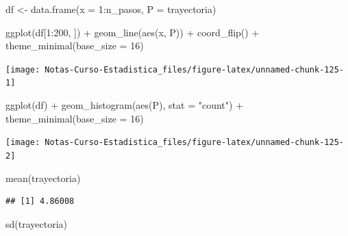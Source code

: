 \documentclass[
  12pt,
]{book}
\newenvironment{Shaded}{\begin{snugshade}}{\end{snugshade}}
\newcommand{\AttributeTok}[1]{\textcolor[rgb]{0.77,0.63,0.00}{#1}}
\newcommand{\DecValTok}[1]{\textcolor[rgb]{0.00,0.00,0.81}{#1}}
\newcommand{\FunctionTok}[1]{\textcolor[rgb]{0.00,0.00,0.00}{#1}}
\newcommand{\NormalTok}[1]{#1}
\newcommand{\OtherTok}[1]{\textcolor[rgb]{0.56,0.35,0.01}{#1}}
\newcommand{\SpecialCharTok}[1]{\textcolor[rgb]{0.00,0.00,0.00}{#1}}
\newcommand{\StringTok}[1]{\textcolor[rgb]{0.31,0.60,0.02}{#1}}
\theoremstyle{definition}
\theoremstyle{definition}
\theoremstyle{definition}
\theoremstyle{remark}
\begin{document}
\begin{Shaded}
\begin{Highlighting}[]
\NormalTok{df }\OtherTok{\textless{}{-}} \FunctionTok{data.frame}\NormalTok{(}\AttributeTok{x =} \DecValTok{1}\SpecialCharTok{:}\NormalTok{n\_pasos, }\AttributeTok{P =}\NormalTok{ trayectoria)}

\FunctionTok{ggplot}\NormalTok{(df[}\DecValTok{1}\SpecialCharTok{:}\DecValTok{200}\NormalTok{, ]) }\SpecialCharTok{+} \FunctionTok{geom\_line}\NormalTok{(}\FunctionTok{aes}\NormalTok{(x, P)) }\SpecialCharTok{+} \FunctionTok{coord\_flip}\NormalTok{() }\SpecialCharTok{+} 
    \FunctionTok{theme\_minimal}\NormalTok{(}\AttributeTok{base\_size =} \DecValTok{16}\NormalTok{)}
\end{Highlighting}
\end{Shaded}

\begin{center}\texttt{[image: Notas-Curso-Estadistica\_files/figure-latex/unnamed-chunk-125-1]} \end{center}

\begin{Shaded}
\begin{Highlighting}[]
\FunctionTok{ggplot}\NormalTok{(df) }\SpecialCharTok{+} \FunctionTok{geom\_histogram}\NormalTok{(}\FunctionTok{aes}\NormalTok{(P), }\AttributeTok{stat =} \StringTok{"count"}\NormalTok{) }\SpecialCharTok{+} 
    \FunctionTok{theme\_minimal}\NormalTok{(}\AttributeTok{base\_size =} \DecValTok{16}\NormalTok{)}
\end{Highlighting}
\end{Shaded}

\begin{center}\texttt{[image: Notas-Curso-Estadistica\_files/figure-latex/unnamed-chunk-125-2]} \end{center}

\begin{Shaded}
\begin{Highlighting}[]
\FunctionTok{mean}\NormalTok{(trayectoria)}
\end{Highlighting}
\end{Shaded}

\begin{verbatim}
## [1] 4.86008
\end{verbatim}

\begin{Shaded}
\begin{Highlighting}[]
\FunctionTok{sd}\NormalTok{(trayectoria)}
\end{Highlighting}
\end{Shaded}
\end{document}
